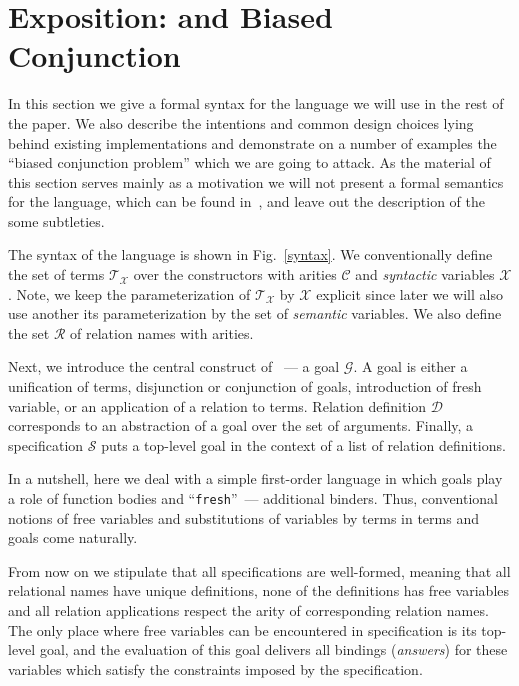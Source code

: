 \section{Exposition: \mk and Biased Conjunction}
\label{sec:exposition}

In this section we give a formal syntax for the language we will use in the rest of the paper. We also describe the intentions and common design
choices lying behind existing implementations and demonstrate on a number of examples the ``biased conjunction problem'' which we are going to attack.
As the material of this section serves mainly as a motivation we will not present a formal semantics for the language, which can be found in~\cite{fair:semantics},
and leave out the description of the some subtleties.

The syntax of the language is shown in Fig.~\ref{syntax}. We conventionally define the set of terms $\mathcal{T}_\mathcal{X}$
over the constructors with arities $\mathcal{C}$ and \emph{syntactic} variables $\mathcal{X}$. Note, we keep the parameterization of $\mathcal{T}_\mathcal{X}$ by $\mathcal{X}$
explicit since later we will also use another its parameterization by the set of \emph{semantic} variables. We also define the set $\mathcal{R}$ of relation names with arities.

Next, we introduce the central construct of \mk~--- a goal $\mathcal{G}$. A goal is either a unification of terms, disjunction or conjunction of goals, introduction of fresh variable,
or an application of a relation to terms. Relation definition $\mathcal{D}$ corresponds to an abstraction of a goal over the set of arguments. Finally, a specification $\mathcal{S}$
puts a top-level goal in the context of a list of relation definitions.

In a nutshell, here we deal with a simple first-order language in which goals play a role of function bodies and ``\lstinline|fresh|''~--- additional binders. Thus,
conventional notions of free variables and substitutions of variables by terms in terms and goals come naturally.

From now on we stipulate that all specifications are well-formed, meaning that all relational names have unique definitions, none of the definitions has
free variables and all relation applications respect the arity of corresponding relation names. The only place where free variables can be encountered in specification
is its top-level goal, and the evaluation of this goal delivers all bindings (\emph{answers}) for these variables which satisfy the constraints imposed by the specification.

